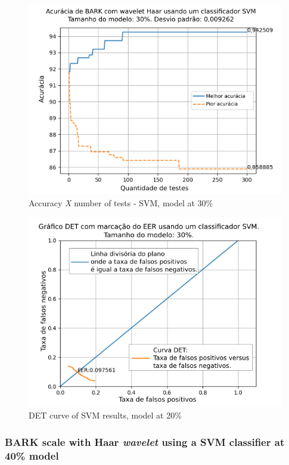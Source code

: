 			\begin{figure}[ht]
				\centering
				\includegraphics[width=\linewidth]{images/results/confusionMatrices/classifier_SVM_30.png}
				\caption{Accuracy \textit{X} number of tests - SVM, model at 30\%}
				\label{fig:classifiersvm30}
			\end{figure}
			
			\begin{figure}[h]
				\centering
				\includegraphics[width=\linewidth]{images/results/det/DET_SVM_30}
				\caption{DET curve of SVM results, model at 20\%}
				\label{fig:detsvm30}
			\end{figure}
		
		\subsubsection{BARK scale with Haar \textit{wavelet} using a SVM classifier at 40\% model}
			
			
